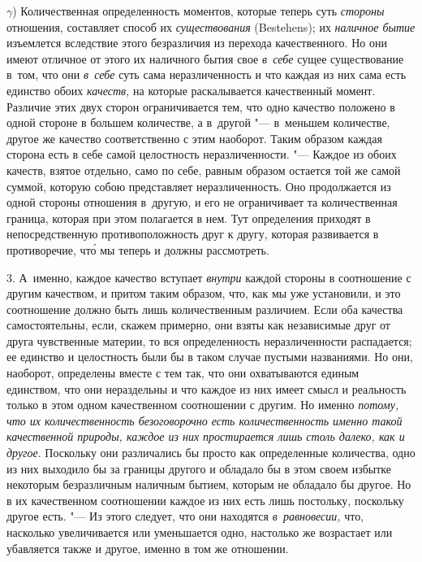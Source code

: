 $\gamma$) Количественная определенность моментов, которые теперь суть
{\em стороны} отношения, составляет способ их {\em существования} (Bestehens);
их {\em наличное бытие} изъемлется вследствие этого безразличия из перехода
качественного. Но они имеют отличное от этого их наличного бытия свое
{\em в~себе} сущее существование в~том, что они {\em в~себе} суть сама
неразличенность и что каждая из них сама есть единство обоих {\em качеств,} на
которые раскалывается качественный момент. Различие этих двух сторон
ограничивается тем, что одно качество положено в одной стороне в большем
количестве, а в~другой "--- в~меньшем количестве, другое же качество
соответственно с этим наоборот. Таким образом каждая сторона есть в себе самой
целостность неразличенности. "--- Каждое из обоих качеств, взятое отдельно,
само по себе, равным образом остается той же самой суммой, которую собою
представляет неразличенность. Оно продолжается из одной стороны отношения
в~другую, и его не ограничивает та количественная граница, которая при этом
полагается в нем. Тут определения приходят в непосредственную противоположность
друг к другу, которая развивается в противоречие, чт\'{о} мы теперь и должны
рассмотреть.

3. А~именно, каждое качество вступает {\em внутри} каждой стороны в соотношение
с другим качеством, и притом таким образом, что, как мы уже установили, и это
соотношение должно быть лишь количественным различием. Если оба качества
самостоятельны, если, скажем примерно, они взяты как независимые друг от друга
чувственные материи, то вся определенность неразличенности распадается; ее
единство и целостность были бы в таком случае пустыми названиями. Но они,
наоборот, определены вместе с тем так, что они охватываются единым единством,
что они нераздельны и что каждое из них имеет смысл и реальность только в этом
одном качественном соотношении с другим. Но именно {\em потому, что их
количественность безоговорочно есть количественность именно такой качественной
природы, каждое из них простирается лишь столь далеко, как и другое}. Поскольку
они различались бы просто как определенные количества, одно из них выходило бы
за границы другого и обладало бы в этом своем избытке некоторым безразличным
наличным бытием, которым не обладало бы другое. Но в их качественном
соотношении каждое из них есть лишь постольку, поскольку другое есть. "--- Из
этого следует, что они находятся {\em в~равновесии,} что, насколько
увеличивается или уменьшается одно, настолько же возрастает или убавляется
также и другое, именно в том же отношении.

